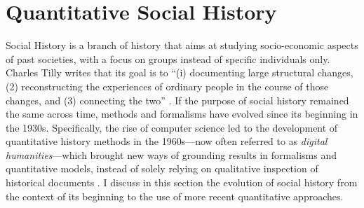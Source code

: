 


\section{Quantitative Social History}\label{sec:social-history}


Social History is a branch of history that aims at studying socio-economic aspects of past societies, with a focus on groups instead of specific individuals only.
Charles Tilly writes that its goal is to ``(i) documenting large structural changes, (2) reconstructing the experiences of ordinary people in the course of those changes, and (3) connecting the two'' \cite{tilly1984retrieving}.
If the purpose of social history remained the same across time, methods and formalisms have evolved since its beginning in the 1930s.
Specifically, the rise of computer science led to the development of quantitative history methods in the 1960s---now often referred to as \textit{digital humanities}---which brought new ways of grounding results in formalisms and quantitative models, instead of solely relying on qualitative inspection of historical documents \cite{haskinsUnderstandingQuantitativeHistory2011}.
I discuss in this section the evolution of social history from the context of its beginning to the use of more recent quantitative approaches.




